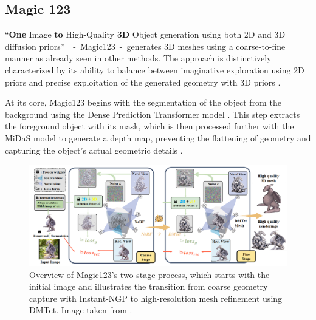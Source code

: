 \subsection{Magic 123}\label{Magic123}

``\textbf{One} Image \textbf{to} High-Quality \textbf{3D} Object generation using both 2D and 3D diffusion priors''~\citep{qian2023magic123}~-~Magic123~-~generates 3D meshes using a coarse-to-fine manner as already seen in other methods. The approach is distinctively characterized by its ability to balance between imaginative exploration  using 2D priors and precise exploitation of the generated geometry with 3D priors \citep{qian2023magic123}.

At its core, Magic123 begins with the segmentation of the object from the background using the Dense Prediction Transformer model \citep{ranftl2021vision}. This step extracts the foreground object with its mask, which is then processed further with the MiDaS \citep{ranftl2020robust} model to generate a depth map, preventing the flattening of geometry and capturing the object's actual geometric details \citep{qian2023magic123}.

\begin{figure}[ht]
  \centering
    \includegraphics[width=1\columnwidth]{figures/Magic123.png}
    \caption{Overview of Magic123's two-stage process, which starts with the initial image and illustrates the transition from coarse geometry capture with Instant-NGP to high-resolution mesh refinement using DMTet. Image taken from \citep{qian2023magic123}.}\label{fig:figureMagic123}
\end{figure}


